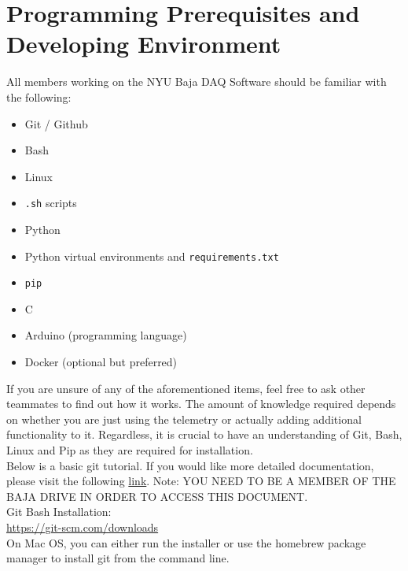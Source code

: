 \documentclass[12pt, letterpaper]{article}
\begin{document}
\section {Programming Prerequisites and Developing Environment}
\par All members working on the NYU Baja DAQ Software should be familiar with the following: 
\begin{itemize}
	\item Git / Github
	\item Bash
	\item Linux
	\item \texttt{.sh} scripts
	\item Python
	\item Python virtual environments and \texttt{requirements.txt}
	\item \texttt{pip}
	\item C
	\item Arduino (programming language)
	\item Docker (optional but preferred)
\end{itemize}
\par If you are unsure of any of the aforementioned items, feel free to ask other teammates to find out how it works. The amount of knowledge required depends on whether you are just using the telemetry or actually adding additional functionality to it. Regardless, it is crucial to have an understanding of Git, Bash, Linux and Pip as they are required for installation. \\

Below is a basic git tutorial. If you would like more detailed documentation, please visit the following \href{https://docs.google.com/document/d/1UZTql9ehKAVS1FU45GWRngsuxctNcDY6T-cq5tJqQJY/edit?usp=sharing}{link}. Note: YOU NEED TO BE A MEMBER OF THE BAJA DRIVE IN ORDER TO ACCESS THIS DOCUMENT.  \\[1\baselineskip]

\noindent Git Bash Installation: \\[1\baselineskip]

\noindent\url{https://git-scm.com/downloads} \\[1\baselineskip]

\noindent On Mac OS, you can either run the installer or use the homebrew package manager to install git from the command line. \\[1\baselineskip]

\end{document}
